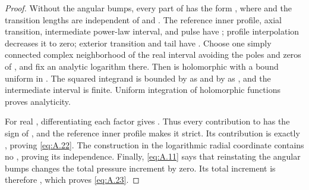 \begin{proof}
Without the angular bumps, every part of  has the form
, where  and the
transition lengths are independent of  and
. The reference inner profile, axial transition,
intermediate power-law interval, and pulse have ; profile
interpolation decreases it to zero; exterior transition and tail have
. Choose one simply connected
%
complex neighborhood of the real interval avoiding the poles and zeros of
, and fix an analytic logarithm there. Then
 is holomorphic with a bound uniform
in . The squared integrand is bounded by
 as  and by
 as , and the
intermediate interval is finite. Uniform integration of holomorphic functions proves
analyticity.

For real , differentiating each factor gives
. Thus
every contribution to  has the sign of
, and the reference inner profile makes it strict. Its contribution
is exactly , proving \eqref{eq:A.22}. The construction
in the logarithmic radial coordinate contains no , proving its
independence. Finally, \eqref{eq:A.11} says that reinstating the angular bumps changes the
total pressure increment by zero. Its total increment is therefore
, which proves \eqref{eq:A.23}.
\end{proof}

